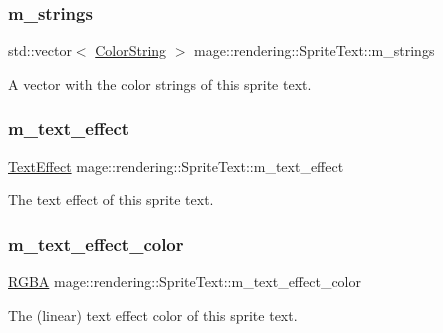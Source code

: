 \subsubsection{\texorpdfstring{m\+\_\+strings}{m\_strings}}
{\footnotesize\ttfamily std\+::vector$<$ \hyperlink{classmage_1_1rendering_1_1_color_string}{Color\+String} $>$ mage\+::rendering\+::\+Sprite\+Text\+::m\+\_\+strings\hspace{0.3cm}{\ttfamily [private]}}

A vector with the color strings of this sprite text. \hypertarget{classmage_1_1rendering_1_1_sprite_text_a795a35dc3671097dd29afaa4b2c5ac3a}{}\label{classmage_1_1rendering_1_1_sprite_text_a795a35dc3671097dd29afaa4b2c5ac3a} 
\subsubsection{\texorpdfstring{m\+\_\+text\+\_\+effect}{m\_text\_effect}}
{\footnotesize\ttfamily \hyperlink{classmage_1_1rendering_1_1_sprite_text_af07ecf28d2ab8997c011cab74e799ef7}{Text\+Effect} mage\+::rendering\+::\+Sprite\+Text\+::m\+\_\+text\+\_\+effect\hspace{0.3cm}{\ttfamily [private]}}

The text effect of this sprite text. \hypertarget{classmage_1_1rendering_1_1_sprite_text_a2fffa5ce343b92f32cbfe5234b182247}{}\label{classmage_1_1rendering_1_1_sprite_text_a2fffa5ce343b92f32cbfe5234b182247} 
\subsubsection{\texorpdfstring{m\+\_\+text\+\_\+effect\+\_\+color}{m\_text\_effect\_color}}
{\footnotesize\ttfamily \hyperlink{structmage_1_1_r_g_b_a}{R\+G\+BA} mage\+::rendering\+::\+Sprite\+Text\+::m\+\_\+text\+\_\+effect\+\_\+color\hspace{0.3cm}{\ttfamily [private]}}

The (linear) text effect color of this sprite text. 